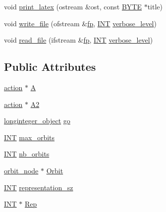 \begin{DoxyCompactItemize}
\item 
void \mbox{\hyperlink{classclassification_a9601dec979b0108e6f44c4169786bac8}{print\+\_\+latex}} (ostream \&ost, const \mbox{\hyperlink{galois_8h_ab6cc7b4aeb6ea31aba2b3fbfc83ff5e6}{B\+Y\+TE}} $\ast$title)
\item 
void \mbox{\hyperlink{classclassification_ad1054483a58da9a4046e951a06da4d01}{write\+\_\+file}} (ofstream \&\mbox{\hyperlink{k__arc__lifting_8_c_a67cc9fbd0817c2d140368e5ed1f2a44d}{fp}}, \mbox{\hyperlink{galois_8h_a09fddde158a3a20bd2dcadb609de11dc}{I\+NT}} \mbox{\hyperlink{simeon_8_c_a818073fbcc2f439e7c56952f67386122}{verbose\+\_\+level}})
\item 
void \mbox{\hyperlink{classclassification_a6bc81afec480f7f7a928a23f1f4cae1a}{read\+\_\+file}} (ifstream \&\mbox{\hyperlink{k__arc__lifting_8_c_a67cc9fbd0817c2d140368e5ed1f2a44d}{fp}}, \mbox{\hyperlink{galois_8h_a09fddde158a3a20bd2dcadb609de11dc}{I\+NT}} \mbox{\hyperlink{simeon_8_c_a818073fbcc2f439e7c56952f67386122}{verbose\+\_\+level}})
\end{DoxyCompactItemize}
\subsection*{Public Attributes}
\begin{DoxyCompactItemize}
\item 
\mbox{\hyperlink{classaction}{action}} $\ast$ \mbox{\hyperlink{classclassification_a3b0380ab416e2a8fbde7d39e9503a0bb}{A}}
\item 
\mbox{\hyperlink{classaction}{action}} $\ast$ \mbox{\hyperlink{classclassification_a756909effb5b0b01b3f389205a4bc05a}{A2}}
\item 
\mbox{\hyperlink{classlonginteger__object}{longinteger\+\_\+object}} \mbox{\hyperlink{classclassification_a386d68ab8ebe2cb336997d0d44711896}{go}}
\item 
\mbox{\hyperlink{galois_8h_a09fddde158a3a20bd2dcadb609de11dc}{I\+NT}} \mbox{\hyperlink{classclassification_a314ef47e657051262f3f48e1819033a3}{max\+\_\+orbits}}
\item 
\mbox{\hyperlink{galois_8h_a09fddde158a3a20bd2dcadb609de11dc}{I\+NT}} \mbox{\hyperlink{classclassification_aeb99b5cc0a82377679cb3a15e9679ae8}{nb\+\_\+orbits}}
\item 
\mbox{\hyperlink{classorbit__node}{orbit\+\_\+node}} $\ast$ \mbox{\hyperlink{classclassification_aa1ce7d7b08e4e98127778efdfd97debf}{Orbit}}
\item 
\mbox{\hyperlink{galois_8h_a09fddde158a3a20bd2dcadb609de11dc}{I\+NT}} \mbox{\hyperlink{classclassification_a8d9b1c855773249f932579c6b6ad4f03}{representation\+\_\+sz}}
\item 
\mbox{\hyperlink{galois_8h_a09fddde158a3a20bd2dcadb609de11dc}{I\+NT}} $\ast$ \mbox{\hyperlink{classclassification_aaecfa5813becb2c3877487e51e16363e}{Rep}}
\end{DoxyCompactItemize}


